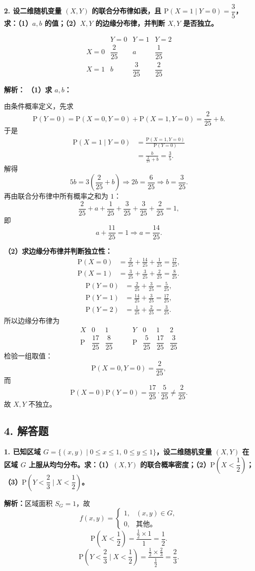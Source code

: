 ﻿\documentclass[UTF8,11pt,a4paper]{ctexart}
\newcommand{\Pp}{\mathrm{P}}
\newcommand{\Ana}[1]{\par\textbf{解析：}#1\par\medskip}
\newcommand{\Q}[1]{\par\textbf{#1}\par}
\begin{document}
\Q{2. 设二维随机变量 $(X,Y)$ 的联合分布律如表，且 $\Pp(X=1\mid Y=0)=\dfrac35$，求：（1）$a,b$ 的值；（2）$X,Y$ 的边缘分布律，并判断 $X,Y$ 是否独立。}
\[
\begin{array}{c|ccc}
 &Y=0&Y=1&Y=2\\\hline
X=0&\dfrac2{25}&a&\dfrac1{25}\\
X=1&b&\dfrac3{25}&\dfrac2{25}
\end{array}
\]
\Ana{
\textbf{（1）求 $a,b$：}

由条件概率定义，先求
\[
\Pp(Y=0)=\Pp(X=0,Y=0)+\Pp(X=1,Y=0)=\frac2{25}+b.
\]
于是
\[
\begin{aligned}
\Pp(X=1\mid Y=0)
&=\frac{\Pp(X=1,Y=0)}{\Pp(Y=0)}\\
&=\frac{b}{\frac2{25}+b}=\frac35.
\end{aligned}
\]
解得
\[
5b=3\left(\frac2{25}+b\right)
\Rightarrow 2b=\frac6{25}
\Rightarrow b=\frac3{25}.
\]
再由联合分布律中所有概率之和为 $1$：
\[
\frac2{25}+a+\frac1{25}+\frac3{25}+\frac3{25}+\frac2{25}=1,
\]
即
\[
a+\frac{11}{25}=1\Rightarrow a=\frac{14}{25}.
\]

\textbf{（2）求边缘分布律并判断独立性：}
\[
\begin{aligned}
\Pp(X=0)&=\frac2{25}+\frac{14}{25}+\frac1{25}=\frac{17}{25},\\
\Pp(X=1)&=\frac3{25}+\frac3{25}+\frac2{25}=\frac8{25}.
\end{aligned}
\]
\[
\begin{aligned}
\Pp(Y=0)&=\frac2{25}+\frac3{25}=\frac5{25},\\
\Pp(Y=1)&=\frac{14}{25}+\frac3{25}=\frac{17}{25},\\
\Pp(Y=2)&=\frac1{25}+\frac2{25}=\frac3{25}.
\end{aligned}
\]
所以边缘分布律为
\[
\begin{array}{c|cc}
X&0&1\\\hline
\Pp&\dfrac{17}{25}&\dfrac8{25}
\end{array}
\qquad
\begin{array}{c|ccc}
Y&0&1&2\\\hline
\Pp&\dfrac5{25}&\dfrac{17}{25}&\dfrac3{25}
\end{array}
\]
检验一组取值：
\[
\Pp(X=0,Y=0)=\frac2{25},
\]
而
\[
\Pp(X=0)\Pp(Y=0)=\frac{17}{25}\cdot\frac5{25}\ne\frac2{25}.
\]
故 $X,Y$ 不独立。
}

\subsection*{4. 解答题}
\Q{1. 已知区域 $G=\{(x,y)\mid0\le x\le1,\ 0\le y\le1\}$，设二维随机变量 $(X,Y)$ 在区域 $G$ 上服从均匀分布。求：（1）$(X,Y)$ 的联合概率密度；（2）$\Pp\left(X<\dfrac12\right)$；（3）$\Pp\left(Y<\dfrac23\mid X<\dfrac12\right)$。}
\Ana{区域面积 $S_G=1$，故
\[
f(x,y)=\begin{cases}1,&(x,y)\in G,\\0,&\text{其他}。\end{cases}
\]
\[
\Pp\left(X<\frac12\right)=\frac{\frac12\times1}{1}=\frac12.
\]
\[
\Pp\left(Y<\frac23\mid X<\frac12\right)=\frac{\frac12\times\frac23}{\frac12}=\frac23.
\]}
\end{document}
